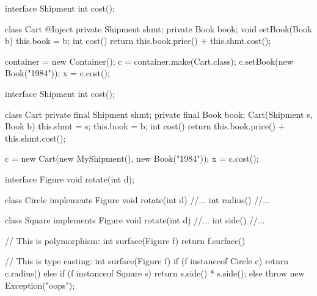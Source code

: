 \documentclass{article}
\begin{document}
\begin{pptWide}{2}
{\scriptsize\begin{ffcode}
interface Shipment
  int cost();

class Cart
  @Inject private Shipment shmt;
  private Book book;
  void setBook(Book b)
    this.book = b;
  int cost()
    return this.book.price() + this.shmt.cost();

container = new Container();
c = container.make(Cart.class);
c.setBook(new Book("1984"));
x = c.cost();
\end{ffcode}
}
\par\columnbreak\par
{\scriptsize\begin{ffcode}
interface Shipment
  int cost();

class Cart
  private final Shipment shmt;
  private final Book book;
  Cart(Shipment s, Book b)
    this.shmt = s;
    this.book = b;
  int cost()
    return this.book.price() + this.shmt.cost();

c = new Cart(new MyShipment(), new Book("1984"));
x = c.cost();
\end{ffcode}
}
\end{pptWide}
\par
\plush{}


\begin{pptWide}{2}
{\small\begin{ffcode}
interface Figure
  void rotate(int d);

class Circle implements Figure
  void rotate(int d) //...
  int radius() //...

class Square implements Figure
  void rotate(int d) //...
  int side() //...
\end{ffcode}
}
\par\columnbreak\par
{\small\begin{ffcode}
// This is polymorphism:
int surface(Figure f)
  return f.surface()

// This is type casting:
int surface(Figure f)
  if (f instanceof Circle c) {
    return c.radius()
  } else if (f instanceof Square s) {
    return s.side() * s.side();
  } else {
    throw new Exception("oops");
  }
\end{ffcode}
}
\end{pptWide}
\par
\plush{}
\end{document}
